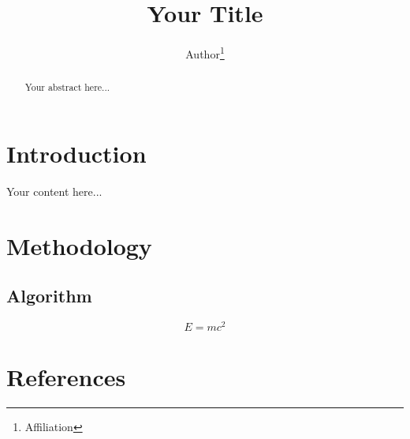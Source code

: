 \documentclass[runningheads]{llncs}
\title{Your Title}
\author{Author\thanks{Affiliation}}
\institute{Your Institution}
\begin{document}
\maketitle

\begin{abstract}
Your abstract here...
\end{abstract}

\section{Introduction}
Your content here...

\section{Methodology}
\subsection{Algorithm}
\begin{equation}
  E = mc^2
\end{equation}

\section*{References}

\end{document}
